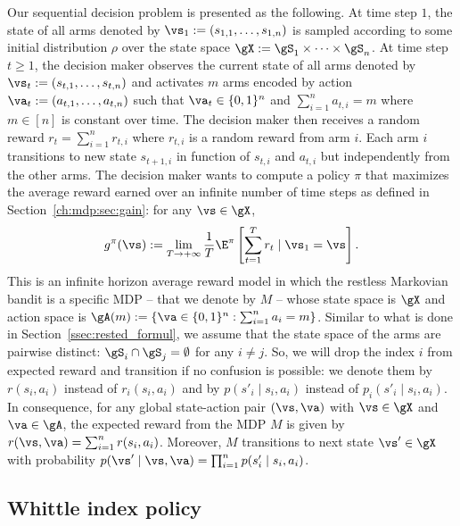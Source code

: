 Our sequential decision problem is presented as the following.
At time step $1$, the state of all arms denoted by $\vs_1:=(s_{1,1},\dots,s_{1,n})$ is sampled according to some initial distribution $\rho$ over the state space $\gX:=\gS_1\times\dots\times\gS_n$.
At time step $t\ge1$, the decision maker observes the current state of all arms denoted by $\vs_t:=(s_{t,1},\dots,s_{t,n})$ and activates $m$ arms encoded by action $\va_t:=(a_{t,1},\dots,a_{t,n})$ such that $\va_t\in\{0,1\}^n$ and $\sum_{i=1}^{n} a_{t,i}=m$ where $m\in[n]$ is constant over time.
The decision maker then receives a random reward $r_t=\sum_{i=1}^{n}r_{t,i}$ where $r_{t,i}$ is a random reward from arm $i$.
Each arm $i$ transitions to new state $s_{t+1,i}$ in function of $s_{t,i}$ and $a_{t,i}$ but independently from the other arms.
The decision maker wants to compute a policy $\pi$ that maximizes the average reward earned over an infinite number of time steps as defined in Section~\ref{ch:mdp:sec:gain}: for any $\vs\in\gX$,
\begin{equation}
    \label{ch:mb:eq:gain_defn}
    g^\pi(\vs) := \lim_{T\to+\infty}\frac1T \E^\pi\left[ \sum_{t=1}^{T} r_t \mid \vs_1=\vs\right].
\end{equation}
This is an infinite horizon average reward model in which the restless Markovian bandit is a specific MDP -- that we denote by $M$ -- whose state space is $\gX$ and action space is $\gA(m):=\{\va\in\{0,1\}^n : \sum_{i=1}^{n}a_i =m\}$.
Similar to what is done in Section~\ref{ssec:rested_formul}, we assume that the state space of the arms are pairwise distinct: $\gS_i\cap\gS_j=\emptyset$ for any $i\neq j$.
So, we will drop the index $i$ from expected reward and transition if no confusion is possible: we denote them by $r(s_i,a_i)$ instead of $r_i(s_i,a_i)$ and by $p(s'_i\mid s_i,a_i)$ instead of $p_i(s'_i\mid s_i,a_i)$.
In consequence, for any global state-action pair $(\vs,\va)$ with $\vs\in\gX$ and $\va\in\gA$, the expected reward from the MDP $M$ is given by $r(\vs,\va)=\sum_{i=1}^{n}r(s_i,a_i)$.
Moreover, $M$ transitions to next state $\vs'\in\gX$ with probability $p(\vs'\mid \vs,\va)=\prod_{i=1}^n p(s'_i\mid s_i,a_i)$.


\subsection{Whittle index policy}
\label{subsec:whittle_idx}

